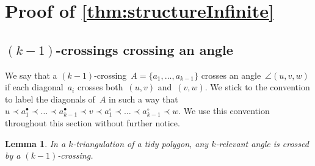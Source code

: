 \documentclass{amsart}
\newtheorem{lemma}[theorem]{Lemma}
\newtheorem{ce}[theorem]{Counter-example}
\theoremstyle{remark}
\newcommand*{\nbd}[0]{neighbourhood\xspace}
\newcommand*{\ef}[0]{E-finite\xspace}
\newcommand*{\vf}[0]{V-finite\xspace}
\newcommand*{\ktg}[0]{$k$-triangulation\xspace}
\newcommand{\cl}{\prec}
\begin{document}
%
%
%
%
%
%
%


\section{Proof of \cref{thm:structureInfinite}}
\label{sec:prfInfinite}


\subsection{$(k-1)$-crossings crossing an angle}

We say that a $(k-1)$-crossing~$A = \{a_1, \dots, a_{k-1}\}$ crosses an angle~$\angle(u,v,w)$ if each diagonal~$a_i$ crosses both~$(u,v)$ and~$(v,w)$. We stick to the convention to label the diagonals of~$A$ in such a way that $u \cl a^\bullet_1 \cl \dots \cl a^\bullet_{k-1} \cl v \cl a^\circ_1 \cl \dots \cl a^\circ_{k-1} \cl w$. We use this convention throughout this section without further notice.

\begin{lemma}
\label{lem:tidyExists}
In a \ktg of a tidy polygon, any $k$-relevant angle is crossed by a $(k-1)$-crossing.
\end{lemma}
\end{document}
